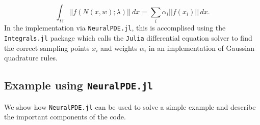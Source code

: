 \documentclass{CUP-JNL-DTM}%
\theoremstyle{definition}
\numberwithin{equation}{section}
\newcommand{\Julia}{\texttt{Julia} }
\begin{document}
\begin{equation}
	\int_{\Omega} ||f(N(x,w); \lambda)||\,dx = \sum_i \alpha_i ||f(x_i)||\,dx.
\end{equation}
In the implementation via \texttt{NeuralPDE.jl}, this is accomplised using the \texttt{Integrals.jl} package which calls the \Julia differential equation solver \cite{rackauckasDifferentialEquationsJlPerformant2017} to find the correct sampling points $x_i$ and weights $\alpha_i$ in an implementation of Gaussian quadrature rules. 

\subsection{Example using \texttt{NeuralPDE.jl}}

We show how \texttt{NeuralPDE.jl} can be used to solve a simple example and describe the important components of the code. 
\end{document}
